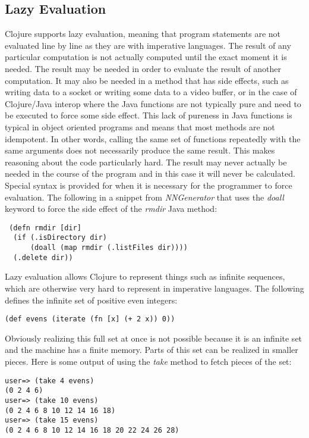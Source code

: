 \subsection{Lazy Evaluation}
Clojure supports lazy evaluation, meaning that program statements are not
evaluated line by line as they are with imperative languages. 
The result of any particular computation is not actually computed until the
exact moment it is needed.
The result may be needed in order to evaluate the result of another computation. 
It may also be needed in a method that has side effects, such as
writing data to a socket or writing some data to a video buffer, or in
the case of Clojure/Java interop where the Java functions are not
typically pure and need to be executed to force some side effect.
This lack of pureness in Java functions is typical in object oriented
programs and means that most methods are not idempotent.
In other words, calling the same set of functions repeatedly with the
same arguments does not necessarily produce the same result.
This makes reasoning about the code particularly hard.
The result may never actually be needed in the course of the program
and in this case it will never be calculated.
Special syntax is provided for when it is necessary for the programmer
to force
evaluation. The following in a snippet from {\em NNGenerator} that
uses the {\it doall} keyword to force the side effect of the {\it rmdir} Java method: 

\lstset{language=Clojure}
\begin{lstlisting}
 (defn rmdir [dir]
  (if (.isDirectory dir)
      (doall (map rmdir (.listFiles dir))))
  (.delete dir))
\end{lstlisting}

Lazy evaluation allows Clojure to represent things such as infinite sequences,
which are otherwise very hard to represent in imperative languages. 
The following defines the infinite set of positive even integers: 

\lstset{language=Clojure}
\begin{lstlisting}
(def evens (iterate (fn [x] (+ 2 x)) 0))
\end{lstlisting}

Obviously realizing this full set at once is not possible because it
is an infinite set and the machine has a finite memory.
Parts of this set can be realized in smaller pieces. Here is some
output of using the {\it take} method to fetch pieces of the set: 
\lstset{language=Clojure}
\begin{lstlisting}
user=> (take 4 evens)
(0 2 4 6)
user=> (take 10 evens)
(0 2 4 6 8 10 12 14 16 18)
user=> (take 15 evens)
(0 2 4 6 8 10 12 14 16 18 20 22 24 26 28)
\end{lstlisting}

